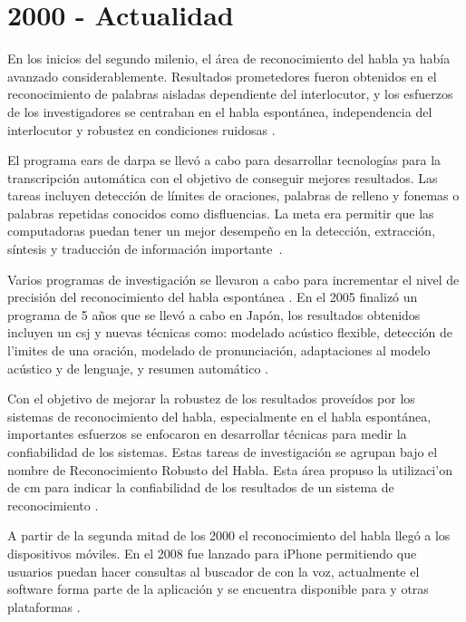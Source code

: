 \section{2000 - Actualidad}
\label{sec:post2000s}

En los inicios del segundo milenio, el \'{a}rea de reconocimiento del habla ya hab\'{i}a avanzado 
considerablemente. Resultados prometedores fueron obtenidos en el reconocimiento de palabras aisladas
dependiente del interlocutor, y los esfuerzos de los investigadores se centraban en el habla 
espont\'{a}nea, independencia del interlocutor y robustez en condiciones ruidosas \cite{RonzhinSurvey2006}.

El programa \gls{ears} de \gls{darpa} se llev\'{o} a cabo para desarrollar tecnolog\'{i}as para la
transcripci\'{o}n autom\'{a}tica con el objetivo de conseguir mejores resultados. 
Las tareas incluyen detecci\'{o}n de l\'{i}mites de oraciones, palabras de relleno 
y fonemas o palabras repetidas conocidos como disfluencias. 
La meta era permitir que las computadoras puedan tener un mejor desempe\~{n}o en la detecci\'{o}n, 
extracci\'{o}n, s\'{i}ntesis y traducci\'{o}n de informaci\'{o}n 
\mbox{importante \cite{LiuStructural2005, SoltauTheIBM2005}.}

Varios programas de investigaci\'{o}n se llevaron a cabo para incrementar el nivel de precisi\'{o}n del 
reconocimiento del habla espont\'{a}nea . En el 2005 finaliz\'{o} un programa de 5 a\~{n}os que se llev\'{o} a cabo en Jap\'{o}n, los resultados obtenidos incluyen un \gls{csj} 
y nuevas t\'{e}cnicas como: modelado ac\'{u}stico flexible, detecci\'{o}n de l'{i}mites de una oraci\'on,
modelado de pronunciaci\'{o}n, adaptaciones al modelo ac\'{u}stico y de lenguaje, 
y resumen autom\'{a}tico \cite{FuruiRecent2005}.

Con el objetivo de mejorar la robustez de los resultados prove\'{i}dos por los sistemas de reconocimiento
del habla, especialmente en el habla espont\'{a}nea, importantes esfuerzos se enfocaron en desarrollar 
t\'{e}cnicas para medir la confiabilidad de los sistemas. Estas tareas de investigaci\'{o}n se agrupan
bajo el nombre de Reconocimiento Robusto del Habla. Esta \'{a}rea propuso la utilizaci'{o}n 
de \gls{cm} para indicar la confiabilidad de los resultados de un sistema de 
reconocimiento \cite{JiangConfidence2005}.

A partir de la segunda mitad de los 2000 el reconocimiento del habla lleg\'{o} a los dispositivos 
m\'{o}viles. En el 2008 fue lanzado  para iPhone permitiendo que usuarios
puedan hacer consultas al buscador de  con la voz, actualmente el software forma parte de 
la aplicaci\'{o}n  y se encuentra disponible para  y otras 
plataformas \cite{GoogleSearch}.

